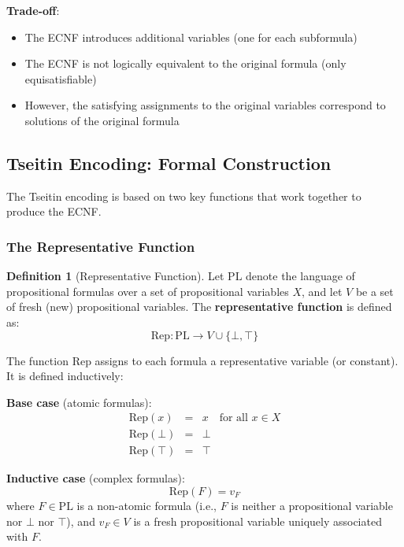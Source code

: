 \documentclass[11pt,a4paper]{article}
\theoremstyle{definition}
\newtheorem{definition}{Definition}[section]
\theoremstyle{plain}
\theoremstyle{remark}
\begin{document}
\textbf{Trade-off}:
\begin{itemize}
    \item The ECNF introduces additional variables (one for each subformula)
    \item The ECNF is not logically equivalent to the original formula (only equisatisfiable)
    \item However, the satisfying assignments to the original variables correspond to solutions of the original formula
\end{itemize}

\subsection{Tseitin Encoding: Formal Construction}

The Tseitin encoding is based on two key functions that work together to produce the ECNF.

\subsubsection{The Representative Function}

\begin{tcolorbox}[colback=cyan!5!white,colframe=cyan!75!black,title=\textbf{Representative Function}]
\begin{definition}[Representative Function]
Let $\text{PL}$ denote the language of propositional formulas over a set of propositional variables $X$, and let $V$ be a set of fresh (new) propositional variables. The \textbf{representative function} is defined as:
\[
\text{Rep}: \text{PL} \rightarrow V \cup \{\bot, \top\}
\]
\end{definition}
\end{tcolorbox}

The function $\text{Rep}$ assigns to each formula a representative variable (or constant). It is defined inductively:

\textbf{Base case} (atomic formulas):
\[
\begin{array}{lcl}
\text{Rep}(x) &=& x \quad \text{for all } x \in X \\
\text{Rep}(\bot) &=& \bot \\
\text{Rep}(\top) &=& \top
\end{array}
\]

\textbf{Inductive case} (complex formulas):
\[
\text{Rep}(F) = v_F
\]
where $F \in \text{PL}$ is a non-atomic formula (i.e., $F$ is neither a propositional variable nor $\bot$ nor $\top$), and $v_F \in V$ is a fresh propositional variable uniquely associated with $F$.
\end{document}

